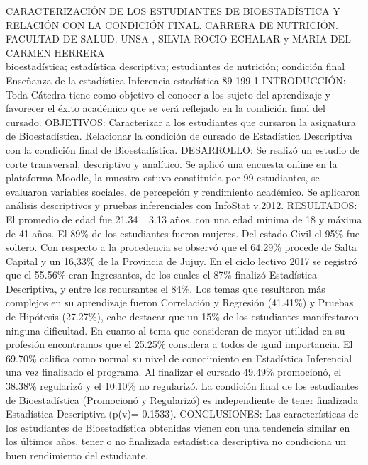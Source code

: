 \A
{CARACTERIZACIÓN DE LOS ESTUDIANTES DE BIOESTADÍSTICA Y RELACIÓN CON LA CONDICIÓN FINAL. CARRERA DE NUTRICIÓN. FACULTAD DE SALUD. UNSA}
{, SILVIA ROCIO ECHALAR y MARIA DEL CARMEN HERRERA}
{
\\}
{bioestadística; estadística descriptiva; estudiantes de nutrición; condición final} 
 {Enseñanza de la estadística} 
 {Inferencia estadística} 
 {89} 
 {199-1}
{INTRODUCCIÓN: Toda Cátedra tiene como objetivo el conocer a los sujeto del aprendizaje y favorecer el éxito académico que se verá reflejado en la condición final del cursado. OBJETIVOS: Caracterizar a los estudiantes que cursaron la asignatura de Bioestadística. Relacionar la condición de cursado de Estadística Descriptiva con la condición final de Bioestadística. DESARROLLO: Se realizó un estudio de corte transversal, descriptivo y analítico. Se aplicó una encuesta online en la plataforma Moodle, la muestra estuvo constituida por 99 estudiantes, se evaluaron variables sociales, de percepción y rendimiento académico. Se aplicaron análisis descriptivos y pruebas inferenciales con InfoStat v.2012. RESULTADOS: El promedio de edad fue 21.34 ±3.13 años, con una edad mínima de 18 y máxima de 41 años. El 89\% de los estudiantes fueron mujeres. Del estado Civil el 95\% fue soltero. Con respecto a la procedencia se observó que el 64.29\% procede de Salta Capital y un 16,33\% de la Provincia de Jujuy. En el ciclo lectivo 2017 se registró que el 55.56\% eran Ingresantes, de los cuales el 87\% finalizó Estadística Descriptiva, y entre los recursantes el 84\%. Los temas que resultaron más complejos en su aprendizaje fueron Correlación y Regresión (41.41\%) y Pruebas de Hipótesis (27.27\%), cabe destacar que un 15\% de los estudiantes manifestaron ninguna dificultad. En cuanto al tema que consideran de mayor utilidad en su profesión encontramos que el 25.25\% considera a todos de igual importancia. El 69.70\% califica como normal su nivel de conocimiento en Estadística Inferencial una vez finalizado el programa. Al finalizar el cursado 49.49\% promocionó, el 38.38\% regularizó y el 10.10\% no regularizó. La condición final de los estudiantes de Bioestadística (Promocionó y Regularizó) es independiente de tener finalizada Estadística Descriptiva (p(v)= 0.1533). CONCLUSIONES: Las características de los estudiantes de Bioestadística obtenidas vienen con una tendencia similar en los últimos años, tener o no finalizada estadística descriptiva no condiciona un buen rendimiento del estudiante.}
